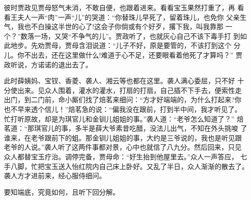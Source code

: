 彼时贾政见贾母怒气未消，不敢自便，也跟着进来。看看宝玉果然打重了，再
看看王夫人一声“肉”一声“儿”的哭道：“你替珠儿早死了，留着珠儿，也免你
父亲生气，我也不白操这半世的心了!这会子你倘或有个好歹，撂下我，叫我靠那
一个？”数落一场，又哭“不争气的儿”。贾政听了，也就灰心自己不该下毒手打
到如此地步。先劝贾母，贾母含泪说道：“儿子不好，原是要管的，不该打到这个
分儿。你不出去，还在这里做什么!难道于心不足，还要眼看着他死了才算吗？”
贾政听说，方诺诺的退出去了。

此时薛姨妈、宝钗、香菱、袭人、湘云等也都在这里。袭人满心委屈，只不好
十分使出来。见众人围着，灌水的灌水，打扇的打扇，自己插不下手去，便索性走
出门，到二门前，命小厮们找了焙茗来细问：“方才好端端的，为什么打起来?你
也不早来透个信儿！”焙茗急的说：“偏我没在跟前，打到半中间，我才听见了。
忙打听原故，却是为琪官儿和金钏儿姐姐的事。”袭人道：“老爷怎么知道了？”
焙茗道：“那琪官儿的事，多半是薛大爷素昔吃醋，没法儿出气，不知在外头挑唆
了谁来，在老爷跟前下的蛆。那金钏儿姐姐的事，大约是三爷说的，我也是听见跟
老爷的人说。”袭人听了这两件事都对景，心中也就信了八九分。然后回来，只见
众人都替宝玉疗治。调停完备，贾母命：“好生抬到他屋里去。”众人一声答应，
七手八脚，忙把宝玉送入怡红院内自己床上卧好。又乱了半日，众人渐渐的散去了。
袭人方才进前来，经心服侍细问。

要知端底，究竟如何，且听下回分解。